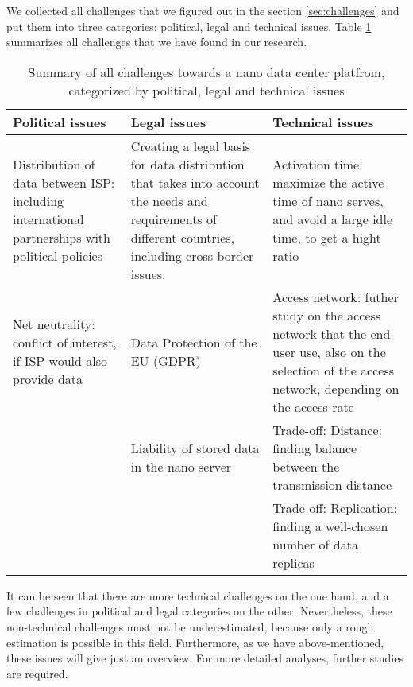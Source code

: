 We collected all challenges that we figured out in the section \ref{sec:challenges} and put them into three categories: political, legal and technical issues. Table \ref{tab:summary} summarizes all challenges that we have found in our research. 

\begin{table}
\begin{minipage}{\columnwidth}
\begin{center}
\begin{tabular}{lll}
\toprule
Political issues & Legal issues & Technical issues \\
\hline
\parbox{.3\linewidth}{Distribution of data between ISP: including international partnerships with political policies} & 
\parbox[c][3cm]{.3\linewidth}{Creating a legal basis for data distribution that takes into account the needs and requirements of different countries, including cross-border issues.} & 
\parbox{.3\linewidth}{Activation time: maximize the active time of nano serves, and avoid a large idle time, to get a hight ratio} \\


\parbox{.3\linewidth}{Net neutrality: conflict of interest, if ISP would also provide data} & 
\parbox{.3\linewidth}{Data Protection of the EU (GDPR)} & 
\parbox[c][2.5cm]{.3\linewidth}{Access network: futher study on the access network that the end-user use, also on the selection of the access network, depending on the access rate} \\


\parbox{.3\linewidth}{} & 
\parbox{.3\linewidth}{Liability of stored data in the nano server} & 
\parbox[c][1.5cm]{.3\linewidth}{Trade-off: Distance: finding balance between the transmission distance} \\

\parbox{.3\linewidth}{} & 
\parbox{.3\linewidth}{} & 
\parbox[c][1.5cm]{.3\linewidth}{Trade-off: Replication: finding a well-chosen number of data replicas} \\				
\bottomrule
\end{tabular}
\end{center}
\bigskip\centering
\end{minipage}
\caption{Summary of all challenges towards a nano data center platfrom, categorized by political, legal and technical issues}\label{tab:summary}
\end{table}

It can be seen that there are more technical challenges on the one hand, and a few challenges in political and legal categories on the other. Nevertheless, these non-technical challenges must not be underestimated, because only a rough estimation is possible in this field. Furthermore, as we have 
above-mentioned, these issues will give just an overview. For more 
detailed analyses, further studies are required.